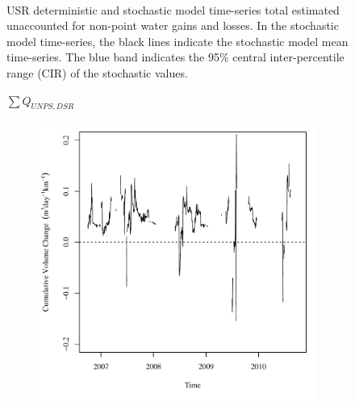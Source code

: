 \begin{landscape}
\begin{figure}
\begin{subfigure}{0.7\textwidth}
		\end{subfigure}\\
		\caption[USR deterministic and stochastic model time-series total estimated unaccounted for non-point water gains and losses.]{USR deterministic and stochastic model time-series total estimated unaccounted for non-point water gains and losses.  In the stochastic model time-series, the black lines indicate the stochastic model mean time-series.  The blue band indicates the 95\% central inter-percentile range (CIR) of the stochastic values.}
		\label{fig:reachWater_US}
	\end{figure}
\end{landscape}
\subfiguretop
\begin{landscape}
	\begin{figure}
		\centering
		$ \displaystyle \sum Q_{UNPS,DSR} $
		\begin{subfigure}{0.7\textwidth}
			\centering
			\includegraphics[width=\tableCustomSize]{"Figures/Results_DSR/Deterministic/Balance Water"}
		\end{subfigure}%
		\begin{subfigure}{0.7\textwidth}
			\centering

\end{subfigure}
\end{figure}
\end{landscape}
